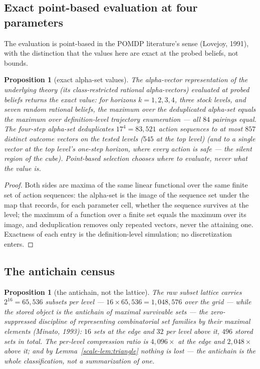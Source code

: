 \documentclass[10pt,twocolumn]{article}
\theoremstyle{plain}
\newtheorem{proposition}[theorem]{Proposition}
\theoremstyle{definition}
\theoremstyle{remark}
\begin{document}
\subsection{Exact point-based evaluation at four parameters}
\label{scale-pbvi}

The evaluation is point-based in the POMDP literature's sense
(Lovejoy, 1991), with the distinction that the values here are exact at
the probed beliefs, not bounds.

\begin{proposition}[exact alpha-set values]\label{scale-prop:pbvi}
The alpha-vector representation of the underlying theory (its
class-restricted rational alpha-vectors) evaluated at probed beliefs
returns the exact value: for horizons \(k = 1, 2, 3, 4\), three stock
levels, and seven random rational beliefs, the maximum over the
deduplicated alpha-set equals the maximum over definition-level
trajectory enumeration --- all \(84\) pairings equal. The four-step
alpha-set deduplicates \(17^{4} = 83{,}521\) action sequences to at most \(857\) distinct outcome vectors on the tested levels
(\(545\) at the top level) (and to a single
vector at the top level's one-step horizon, where every action is
safe --- the silent region of the cube). Point-based selection
chooses where to evaluate, never what the value is.
\end{proposition}

\begin{proof}
Both sides are maxima of the same linear functional over the same
finite set of action sequences: the alpha-set is the image of the
sequence set under the map that records, for each parameter cell,
whether the sequence survives at the level; the maximum of a function
over a finite set equals the maximum over its image, and
deduplication removes only repeated vectors, never the attaining one.
Exactness of each entry is the definition-level simulation; no
discretization enters.
\end{proof}

\subsection{The antichain census}\label{scale-census}

\begin{proposition}[the antichain, not the lattice]\label{scale-prop:census}
The raw subset lattice carries \(2^{16} = 65{,}536\) subsets per
level --- \(16 \times 65{,}536 = 1{,}048{,}576\) over the grid ---
while the stored object is the antichain of maximal survivable sets --- the zero-suppressed
discipline of representing combinatorial set families by their maximal
elements (Minato, 1993):
\(16\) sets at the edge and \(32\) per level above it, \(496\) stored
sets in total. The per-level compression ratio is \(4{,}096\times\) at
the edge and \(2{,}048\times\) above it; and by
Lemma~\ref{scale-lem:triangle} nothing is lost --- the antichain is the
whole classification, not a summarization of one.
\end{proposition}
\end{document}
